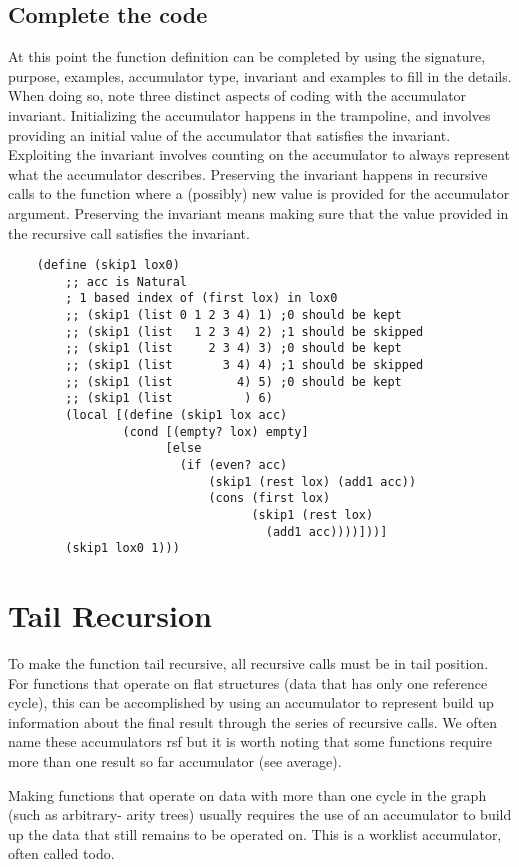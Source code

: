 \documentclass[11pt,a4paper]{report}
\begin{document}
	\subsection*{Complete the code}
	At this point the function definition can be completed by using the signature, purpose, examples,
	accumulator type, invariant and examples to fill in the details. When doing so, note three distinct
	aspects of coding with the accumulator invariant. Initializing the accumulator happens in the
	trampoline, and involves providing an initial value of the accumulator that satisfies the invariant.
	Exploiting the invariant involves counting on the accumulator to always represent what the
	accumulator describes. Preserving the invariant happens in recursive calls to the function where a
	(possibly) new value is provided for the accumulator argument. Preserving the invariant means
	making sure that the value provided in the recursive call satisfies the invariant.
	
	\begin{verbatim}
	(define (skip1 lox0)
		;; acc is Natural
		; 1 based index of (first lox) in lox0
		;; (skip1 (list 0 1 2 3 4) 1) ;0 should be kept
		;; (skip1 (list   1 2 3 4) 2) ;1 should be skipped
		;; (skip1 (list     2 3 4) 3) ;0 should be kept
		;; (skip1 (list       3 4) 4) ;1 should be skipped
		;; (skip1 (list         4) 5) ;0 should be kept
		;; (skip1 (list          ) 6)
		(local [(define (skip1 lox acc)
		        (cond [(empty? lox) empty]
		              [else
		                (if (even? acc)
		                    (skip1 (rest lox) (add1 acc))
		                    (cons (first lox)
		                          (skip1 (rest lox) 
		                            (add1 acc))))]))]
		(skip1 lox0 1)))
	\end{verbatim}
	
	\section{Tail Recursion}
	To make the function tail recursive, all recursive calls must be in tail position. For functions that
	operate on flat structures (data that has only one reference cycle), this can be accomplished by
	using an accumulator to represent build up information about the final result through the series of
	recursive calls. We often name these accumulators rsf but it is worth noting that some functions
	require more than one result so far accumulator (see average).
	
	Making functions that operate on data with more than one cycle in the graph (such as arbitrary-
	arity trees) usually requires the use of an accumulator to build up the data that still remains to be
	operated on. This is a worklist accumulator, often called todo.
	
\end{document}

